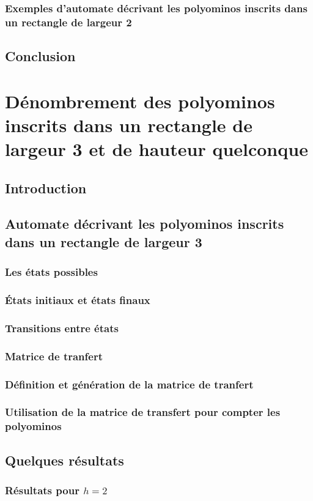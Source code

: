 \documentclass[12pt]{memoireuqam1.3}
\begin{document}
\subsection{Exemples d'automate décrivant les polyominos inscrits dans un rectangle de largeur 2}
\section*{Conclusion}
\chapter{Dénombrement des polyominos inscrits dans un rectangle de largeur 3 et de hauteur quelconque}
\section*{Introduction}
\section{Automate décrivant les polyominos inscrits dans un rectangle de largeur 3}
\subsection{Les états possibles}
\subsection{États initiaux et états finaux}
\subsection{Transitions entre états}
\subsection{Matrice de tranfert}
\subsection{Définition et génération de la matrice de tranfert}
\subsection{Utilisation de la matrice de transfert pour compter les polyominos}
\section{Quelques résultats}
\subsection{Résultats pour $h=2$}
\end{document}
